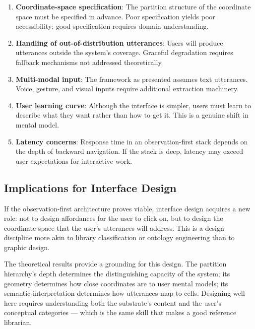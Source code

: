 \documentclass[11pt,twocolumn,a4paper]{article}
\theoremstyle{definition}
\theoremstyle{remark}
\begin{document}
\begin{enumerate}
    \item \textbf{Coordinate-space specification}: The partition structure of the coordinate space must be specified in advance. Poor specification yields poor accessibility; good specification requires domain understanding.

    \item \textbf{Handling of out-of-distribution utterances}: Users will produce utterances outside the system's coverage. Graceful degradation requires fallback mechanisms not addressed theoretically.

    \item \textbf{Multi-modal input}: The framework as presented assumes text utterances. Voice, gesture, and visual inputs require additional extraction machinery.

    \item \textbf{User learning curve}: Although the interface is simpler, users must learn to describe what they want rather than how to get it. This is a genuine shift in mental model.

    \item \textbf{Latency concerns}: Response time in an observation-first stack depends on the depth of backward navigation. If the stack is deep, latency may exceed user expectations for interactive work.
\end{enumerate}

\subsection{Implications for Interface Design}

If the observation-first architecture proves viable, interface design acquires a new role: not to design affordances for the user to click on, but to design the coordinate space that the user's utterances will address. This is a design discipline more akin to library classification or ontology engineering than to graphic design.

The theoretical results provide a grounding for this design. The partition hierarchy's depth determines the distinguishing capacity of the system; its geometry determines how close coordinates are to user mental models; its semantic interpretation determines how utterances map to cells. Designing well here requires understanding both the substrate's content and the user's conceptual categories --- which is the same skill that makes a good reference librarian.
\end{document}
